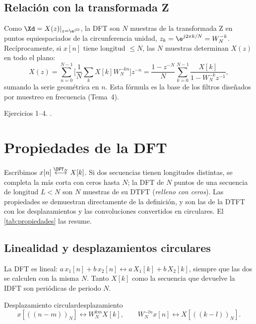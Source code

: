 \documentclass[11pt,a4paper]{scrartcl}
\begin{document}
\subsection{Relación con la transformada Z}

Como $\Xd=X(z)|_{z=\e^{j\Omega}}$, la DFT son $N$ muestras de la transformada Z en puntos equiespaciados de la circunferencia unidad, $z_k=\e^{j2\pi k/N}=W_N^{-k}$. Recíprocamente, si $x[n]$ tiene longitud $\le N$, las $N$ muestras determinan $X(z)$ en todo el plano:
\[
  X(z)=\sum_{n=0}^{N-1}\Big[\frac1N\sum_kX[k]W_N^{-kn}\Big]z^{-n}
  =\frac{1-z^{-N}}{N}\sum_{k=0}^{N-1}\frac{X[k]}{1-W_N^{-k}z^{-1}},
\]
sumando la serie geométrica en $n$. Esta fórmula es la base de los filtros diseñados por muestreo en frecuencia (Tema~4).

\begin{flushright}\small\color{pdsgris}Ejercicios 1–4. .\end{flushright}

\section{Propiedades de la DFT}\label{sec:propiedades}

Escribimos $x[n]\overset{\DFT_N}{\longleftrightarrow}X[k]$. Si dos secuencias tienen longitudes distintas, se completa la más corta con ceros hasta $N$; la DFT de $N$ puntos de una secuencia de longitud $L<N$ son $N$ muestras de su DTFT (\emph{relleno con ceros}). Las propiedades se demuestran directamente de la definición, y son las de la DTFT con los desplazamientos y las convoluciones convertidos en circulares. El \cref{tab:propiedades} las resume.

\subsection{Linealidad y desplazamientos circulares}

La DFT es lineal: $a\,x_1[n]+b\,x_2[n]\leftrightarrow a\,X_1[k]+b\,X_2[k]$, siempre que las dos se calculen con la misma $N$. Tanto $X[k]$ como la secuencia que devuelve la IDFT son periódicas de periodo $N$.

\begin{propiedad}{Desplazamiento circular}{desplazamiento}
  \[
    x[((n-m))_N]\longleftrightarrow W_N^{km}X[k],\qquad W_N^{-ln}x[n]\longleftrightarrow X[((k-l))_N].
  \]
\end{propiedad}
\end{document}
